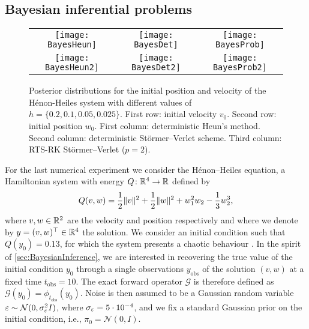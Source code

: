 \documentclass[10pt]{article}
\begin{document}
\subsection{Bayesian inferential problems}\label{sec:BayesianInferenceEx}
\begin{figure}	
	\begin{center}
		
		\vspace{0.1cm}
		\begin{tabular}{ccc}
			\hspace{-0.32cm}\texttt{[image: BayesHeun]}  & \hspace{-0.32cm}\texttt{[image: BayesDet]}  & \hspace{-0.32cm}\texttt{[image: BayesProb]} \\ 
			\texttt{[image: BayesHeun2]} & \texttt{[image: BayesDet2]} & \texttt{[image: BayesProb2]} \\
		\end{tabular}
	\end{center}
	\caption{Posterior distributions for the initial position and velocity of the Hénon-Heiles system with different values of $h = \{0.2, 0.1, 0.05, 0.025\}$. First row: initial velocity $v_0$. Second row: initial position $w_0$. First column: deterministic Heun's method. Second column: deterministic Störmer--Verlet scheme. Third column: RTS-RK Störmer--Verlet ($p=2$).}
	\label{fig:Bayes}
\end{figure}

For the last numerical experiment we consider the Hénon--Heiles equation, a Hamiltonian system with energy $Q\colon \mathbb{R}^4 \to \mathbb{R}$ defined by
\begin{equation}\label{eq:HamHH}
	Q(v, w) = \frac{1}{2}\lVert v\rVert^2 + \frac{1}{2}\lVert w\rVert^2 + w_1^2w_2 - \frac{1}{3}w_2^3,
\end{equation} 
where $v, w \in \mathbb{R}^2$ are the velocity and position respectively and where we denote by $y = (v, w)^\top \in \mathbb{R}^4$ the solution. We consider an initial condition such that $Q(y_0) = 0.13$, for which the system presents a chaotic behaviour \cite{HeH64}. In the spirit of \cref{sec:BayesianInference}, we are interested in recovering the true value of the initial condition $y_0$ through a single observations $y_{\mathrm{obs}}$ of the solution $(v, w)$ at a fixed time $t_{\mathrm{obs}} = 10$. The exact forward operator $\mathcal{G}$ is therefore defined as $\mathcal{G}(y_0) = \phi_{t_{\mathrm{obs}}}(y_0)$. Noise is then assumed to be a Gaussian random variable $\varepsilon \sim \mathcal{N}(0, \sigma_\varepsilon^2 I)$, where $\sigma_\varepsilon = 5 \cdot 10^{-4}$, and we fix a standard Gaussian prior on the initial condition, i.e., $\pi_0 = \mathcal N(0, I)$.
\end{document}
